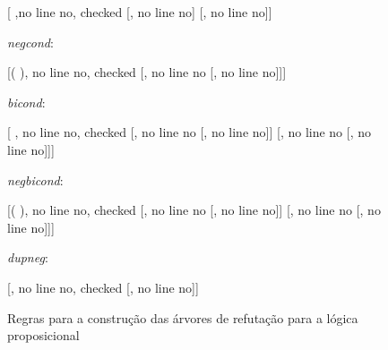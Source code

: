 \begin{figure}[h]
\begin{center}
\begin{minipage}{0.3\textwidth}
\begin{center}
		\begin{tableau}
			{}
			[ \eif {},no line no, checked
			[\enot{}, no line no]
			[, no line no]]
		\end{tableau}
		\end{center}
	\end{minipage}
	\begin{minipage}{0.3\textwidth}
		\begin{center}
			\emph{negcond}:

		\begin{tableau}
			{}
			[\enot( \eif {}), no line no, checked
			[, no line no
			[\enot{}, no line no]]]
		\end{tableau}
		\end{center}
	\end{minipage}

	\vspace{3mm}

	\begin{minipage}{0.3\textwidth}
		\begin{center}
			\emph{bicond}:
		\begin{tableau}
			{}
			[ \eiff {}, no line no, checked
				[, no line no
					[, no line no]]
				[\enot{}, no line no
					[\enot{}, no line no]]]
		\end{tableau}
		\end{center}
	\end{minipage}
	\begin{minipage}{0.3\textwidth}
		\begin{center}
			\emph{negbicond}:
		\begin{tableau}
			{}
			[\enot( \eiff {}), no line no, checked
			[, no line no
				[\enot{}, no line no]]	
			[\enot{}, no line no
				[, no line no]]]
		\end{tableau}
		\end{center}
	\end{minipage}

	\vspace{3mm}
		
	\begin{center}
		\emph{dupneg}:

		\begin{tableau}
			{}
			[\enot \enot {}, no line no, checked
			[, no line no]]
		\end{tableau}
	\end{center}

\end{center}

\caption{Regras para a construção das árvores de refutação para a lógica proposicional}
\label{regrtablos}

\end{figure}

